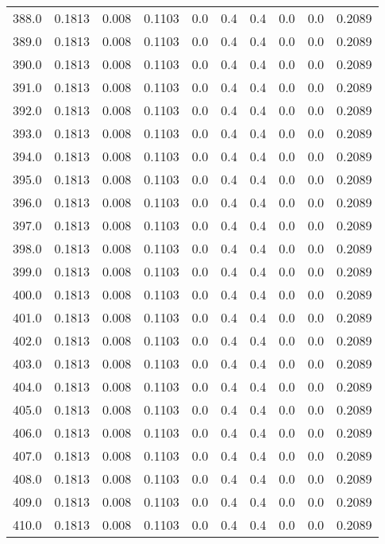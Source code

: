 \begin{longtable}{lrrrrrrrrr}
388.0 & 0.1813 & 0.008 & 0.1103 & 0.0 & 0.4 & 0.4 & 0.0 & 0.0 & 0.2089 \\
389.0 & 0.1813 & 0.008 & 0.1103 & 0.0 & 0.4 & 0.4 & 0.0 & 0.0 & 0.2089 \\
390.0 & 0.1813 & 0.008 & 0.1103 & 0.0 & 0.4 & 0.4 & 0.0 & 0.0 & 0.2089 \\
391.0 & 0.1813 & 0.008 & 0.1103 & 0.0 & 0.4 & 0.4 & 0.0 & 0.0 & 0.2089 \\
392.0 & 0.1813 & 0.008 & 0.1103 & 0.0 & 0.4 & 0.4 & 0.0 & 0.0 & 0.2089 \\
393.0 & 0.1813 & 0.008 & 0.1103 & 0.0 & 0.4 & 0.4 & 0.0 & 0.0 & 0.2089 \\
394.0 & 0.1813 & 0.008 & 0.1103 & 0.0 & 0.4 & 0.4 & 0.0 & 0.0 & 0.2089 \\
395.0 & 0.1813 & 0.008 & 0.1103 & 0.0 & 0.4 & 0.4 & 0.0 & 0.0 & 0.2089 \\
396.0 & 0.1813 & 0.008 & 0.1103 & 0.0 & 0.4 & 0.4 & 0.0 & 0.0 & 0.2089 \\
397.0 & 0.1813 & 0.008 & 0.1103 & 0.0 & 0.4 & 0.4 & 0.0 & 0.0 & 0.2089 \\
398.0 & 0.1813 & 0.008 & 0.1103 & 0.0 & 0.4 & 0.4 & 0.0 & 0.0 & 0.2089 \\
399.0 & 0.1813 & 0.008 & 0.1103 & 0.0 & 0.4 & 0.4 & 0.0 & 0.0 & 0.2089 \\
400.0 & 0.1813 & 0.008 & 0.1103 & 0.0 & 0.4 & 0.4 & 0.0 & 0.0 & 0.2089 \\
401.0 & 0.1813 & 0.008 & 0.1103 & 0.0 & 0.4 & 0.4 & 0.0 & 0.0 & 0.2089 \\
402.0 & 0.1813 & 0.008 & 0.1103 & 0.0 & 0.4 & 0.4 & 0.0 & 0.0 & 0.2089 \\
403.0 & 0.1813 & 0.008 & 0.1103 & 0.0 & 0.4 & 0.4 & 0.0 & 0.0 & 0.2089 \\
404.0 & 0.1813 & 0.008 & 0.1103 & 0.0 & 0.4 & 0.4 & 0.0 & 0.0 & 0.2089 \\
405.0 & 0.1813 & 0.008 & 0.1103 & 0.0 & 0.4 & 0.4 & 0.0 & 0.0 & 0.2089 \\
406.0 & 0.1813 & 0.008 & 0.1103 & 0.0 & 0.4 & 0.4 & 0.0 & 0.0 & 0.2089 \\
407.0 & 0.1813 & 0.008 & 0.1103 & 0.0 & 0.4 & 0.4 & 0.0 & 0.0 & 0.2089 \\
408.0 & 0.1813 & 0.008 & 0.1103 & 0.0 & 0.4 & 0.4 & 0.0 & 0.0 & 0.2089 \\
409.0 & 0.1813 & 0.008 & 0.1103 & 0.0 & 0.4 & 0.4 & 0.0 & 0.0 & 0.2089 \\
410.0 & 0.1813 & 0.008 & 0.1103 & 0.0 & 0.4 & 0.4 & 0.0 & 0.0 & 0.2089 \\

\end{longtable}

